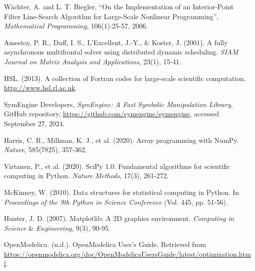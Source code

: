 \documentclass[12pt]{article}
\begin{document}
\newpage
\fancyhead[R]{}
\thispagestyle{fancy}

\begin{thebibliography}{9}

	Wächter, A. and L. T. Biegler, “On the Implementation of an
	Interior-Point Filter Line-Search Algorithm for Large-Scale Nonlinear
	Programming”, \textit{Mathematical Programming}, 106(1):25-57, 2006.

	Amestoy, P. R., Duff, I. S., L’Excellent, J.-Y., \& Koster, J. (2001).
	A fully asynchronous multifrontal solver using distributed dynamic scheduling.
	\textit{SIAM Journal on Matrix Analysis and Applications}, 23(1), 15-41.

	HSL. (2013). A collection of Fortran codes for large-scale scientific
	computation. \url{http://www.hsl.rl.ac.uk}.

	SymEngine Developers,
	\textit{SymEngine: A Fast Symbolic Manipulation Library},
	GitHub repository,
	\url{https://github.com/symengine/symengine},
	accessed September 27, 2024.

	Harris, C. R., Millman, K. J., et al. (2020). Array programming with
	NumPy. \textit{Nature}, 585(7825), 357-362.

	Virtanen, P., et al. (2020). SciPy 1.0: Fundamental algorithms for
	scientific computing in Python. \textit{Nature Methods}, 17(3), 261-272.

	McKinney, W. (2010). Data structures for statistical computing in
	Python. In \textit{Proceedings of the 9th Python in Science Conference} (Vol.
	445, pp. 51-56).

	Hunter, J. D. (2007). Matplotlib: A 2D graphics environment.
	\textit{Computing in Science} \& \textit{Engineering}, 9(3), 90-95.

	OpenModelica. (n.d.). OpenModelica User's Guide. Retrieved from
	\url{https://openmodelica.org/doc/OpenModelicaUsersGuide/latest/optimization.html}.

\end{thebibliography}
\end{document}
